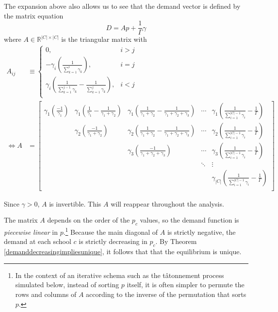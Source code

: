 \documentclass[12pt]{article}
\theoremstyle{definition}
\begin{document}
The expansion above also allows us to see that the demand vector is defined by the matrix equation
\begin{equation}D = A p + \frac{1}{\Gamma}\gamma \label{demandmatrixeq}\end{equation}
where $A\in \mathbb{R}^{|C| \times |C|}$ is the triangular matrix with
\begin{align} \label{Adef}
A_{ij} &\equiv \begin{cases}
0, & i > j \\
-\gamma_i \left(\frac{1}{ \sum_{k=1}^i \gamma_k}\right), & i=j \\
\gamma_i \left( \frac{1}{\sum_{k=1}^{j-1} \gamma_k} -  \frac{1}{\sum_{k=1}^{j} \gamma_k}\right), & i<j \\
\end{cases} \\[.8em]
\iff A &= \begin{bmatrix}
\gamma_1 \left( \frac{-1}{\gamma_1} \right) & \gamma_1 \left(\frac{1}{\gamma_1} - \frac{1}{\gamma_1 + \gamma_2} \right) & \gamma_1 \left(\frac{1}{\gamma_1 + \gamma_2} - \frac{1}{\gamma_1 + \gamma_2 + \gamma_3} \right) & \cdots &  \gamma_1 \left(\frac{1}{\sum_{i=1}^{|C| - 1}\gamma_i} - \frac{1}{\Gamma}  \right)  \\
 & \gamma_2 \left( \frac{-1}{\gamma_1 + \gamma_2} \right) & \gamma_2 \left(\frac{1}{\gamma_1 + \gamma_2} - \frac{1}{\gamma_1 + \gamma_2 + \gamma_3} \right) & \cdots &  \gamma_2 \left(\frac{1}{\sum_{i=1}^{|C| - 1}\gamma_i} - \frac{1}{\Gamma} \right)  \\
 &  & \gamma_3 \left( \frac{-1}{\gamma_1 + \gamma_2 + \gamma_3} \right) & \cdots &  \gamma_3 \left(\frac{1}{\sum_{i=1}^{|C| - 1}\gamma_i} - \frac{1}{\Gamma} \right)  \\
 & & & \ddots & \vdots \\
 &  &  &  &  \gamma_{|C|} \left(\frac{1}{\sum_{i=1}^{|C| - 1}\gamma_i} -\frac{1}{\Gamma}  \right)  \\
\end{bmatrix}\end{align}

Since $\gamma > 0$, $A$ is invertible. This $A$ will reappear throughout the analysis. 

The matrix $A$ depends on the order of the $p_c$ values, so the demand function is \emph{piecewise linear} in $p$.\footnote{In the context of an iterative schema such as the t\^{a}tonnement process simulated below, instead of sorting $p$ itself, it is often simpler to permute the rows and columns of $A$ according to the inverse of the permutation that sorts $p$.} Because the main diagonal of $A$ is strictly negative, the demand at each school $c$ is strictly decreasing in $p_c$. By Theorem \ref{demanddecreasingimpliesunique}, it follows that that the equilibrium is unique.
\end{document}
